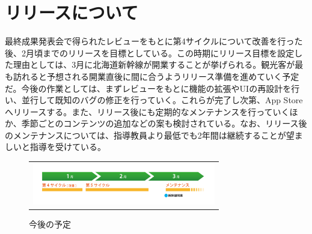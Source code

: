 \section{リリースについて}
最終成果発表会で得られたレビューをもとに第4サイクルについて改善を行った後、2月頃までのリリースを目標としている。この時期にリリース目標を設定した理由としては、3月に北海道新幹線が開業することが挙げられる。観光客が最も訪れると予想される開業直後に間に合うようリリース準備を進めていく予定だ。今後の作業としては、まずレビューをもとに機能の拡張やUIの再設計を行い、並行して既知のバグの修正を行っていく。これらが完了し次第、App Storeへリリースする。また、リリース後にも定期的なメンテナンスを行っていくほか、季節ごとのコンテンツの追加などの案も検討されている。なお、リリース後のメンテナンスについては、指導教員より最低でも2年間は継続することが望ましいと指導を受けている。
\begin{figure}[htbp]
  \begin{center}
    \begin{tabular}{c}

      \begin{minipage}{0.7\hsize}
        \begin{center}
\includegraphics[width=8cm, bb=0 0 1478 338]{release-1.png}
       
        \end{center}
      \end{minipage}

    \end{tabular}
    \caption{今後の予定}
    \label{fig:lena}
  \end{center}
\end{figure}
